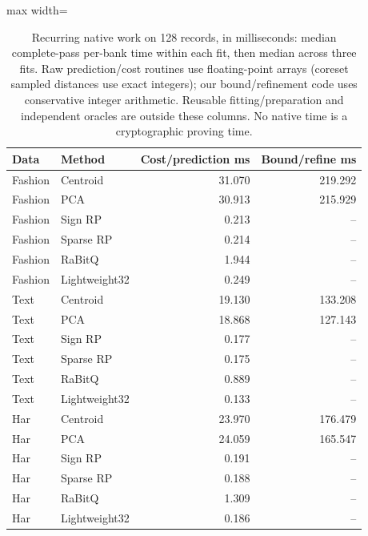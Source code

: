 \begin{table}[tbp]
\centering
\small
\caption{Recurring native work on 128 records, in milliseconds: median complete-pass per-bank time within each fit, then median across three fits. Raw prediction/cost routines use floating-point arrays (coreset sampled distances use exact integers); our bound/refinement code uses conservative integer arithmetic. Reusable fitting/preparation and independent oracles are outside these columns. No native time is a cryptographic proving time.}
\label{tab:latest-native-runtime}
\begin{adjustbox}{max width=\textwidth}
\begin{tabular*}{.98\textwidth}{@{\extracolsep{\fill}}llrr@{}}
\toprule
Data & Method & Cost/prediction ms & Bound/refine ms\\
\midrule
Fashion & Centroid & 31.070 & 219.292\\
Fashion & PCA & 30.913 & 215.929\\
Fashion & Sign RP & 0.213 & --\\
Fashion & Sparse RP & 0.214 & --\\
Fashion & RaBitQ & 1.944 & --\\
Fashion & Lightweight32 & 0.249 & --\\
Text & Centroid & 19.130 & 133.208\\
Text & PCA & 18.868 & 127.143\\
Text & Sign RP & 0.177 & --\\
Text & Sparse RP & 0.175 & --\\
Text & RaBitQ & 0.889 & --\\
Text & Lightweight32 & 0.133 & --\\
Har & Centroid & 23.970 & 176.479\\
Har & PCA & 24.059 & 165.547\\
Har & Sign RP & 0.191 & --\\
Har & Sparse RP & 0.188 & --\\
Har & RaBitQ & 1.309 & --\\
Har & Lightweight32 & 0.186 & --\\
\bottomrule
\end{tabular*}
\end{adjustbox}
\end{table}
